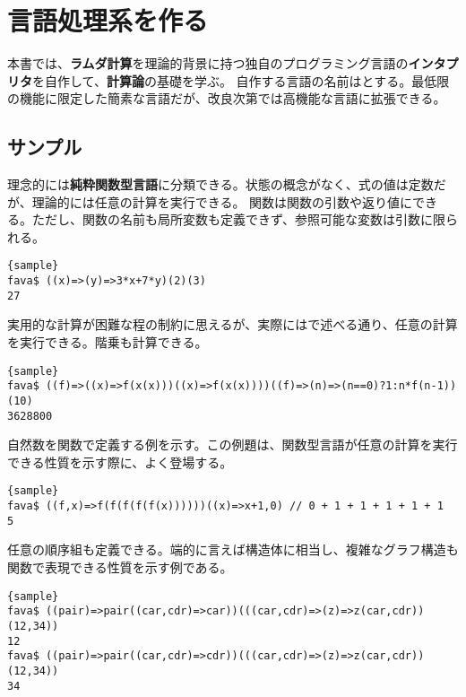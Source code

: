 \documentclass[10pt,a4paper]{book}
\begin{document}
\maketitle
\tableofcontents

\chapter{言語処理系を作る}

本書では、\textbf{ラムダ計算}を理論的背景に持つ独自のプログラミング言語の\textbf{インタプリタ}を自作して、\textbf{計算論}の基礎を学ぶ。
自作する言語の名前は\fava{}とする。最低限の機能に限定した簡素な言語だが、改良次第では高機能な言語に拡張できる。

\section{サンプル}

理念的には\textbf{純粋関数型言語}に分類できる。状態の概念がなく、式の値は定数だが、理論的には任意の計算を実行できる。
関数は関数の引数や返り値にできる。ただし、関数の名前も局所変数も定義できず、参照可能な変数は引数に限られる。

\begin{Verbatim}{sample}
fava$ ((x)=>(y)=>3*x+7*y)(2)(3)
27
\end{Verbatim}

実用的な計算が困難な程の制約に思えるが、実際にはで述べる通り、任意の計算を実行できる。階乗も計算できる。

\begin{Verbatim}{sample}
fava$ ((f)=>((x)=>f(x(x)))((x)=>f(x(x))))((f)=>(n)=>(n==0)?1:n*f(n-1))(10)
3628800
\end{Verbatim}

自然数を関数で定義する例を示す。この例題は、関数型言語が任意の計算を実行できる性質を示す際に、よく登場する。

\begin{Verbatim}{sample}
fava$ ((f,x)=>f(f(f(f(f(x))))))((x)=>x+1,0) // 0 + 1 + 1 + 1 + 1 + 1
5
\end{Verbatim}

任意の順序組も定義できる。端的に言えば構造体に相当し、複雑なグラフ構造も関数で表現できる性質を示す例である。

\begin{Verbatim}{sample}
fava$ ((pair)=>pair((car,cdr)=>car))(((car,cdr)=>(z)=>z(car,cdr))(12,34))
12
fava$ ((pair)=>pair((car,cdr)=>cdr))(((car,cdr)=>(z)=>z(car,cdr))(12,34))
34
\end{Verbatim}
\end{document}
